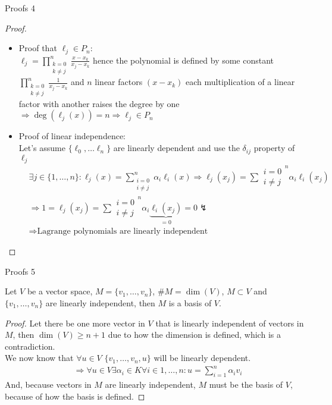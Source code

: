 \documentclass[8pt]{beamer}
\begin{document}
		\begin{frame}{Proofs 4}
			\begin{proof}
				\begin{itemize}
					\item 
					Proof that $\ell_j \in P_n$:\\
					$\displaystyle \ell_j = \prod_{\substack{k= 0 \\ k \neq j }}^{n}\frac{x - x_k}{x_j - x_k}$ hence the polynomial is defined by some constant $\displaystyle \prod_{\substack{k= 0 \\ k \neq j }}^{n}\frac{1}{x_j - x_k}$ and $n$ linear factors $(x-x_k)$ each multiplication of a linear factor with another raises the degree by one $\Rightarrow \deg(\ell_j(x)) = n \Rightarrow \ell_j \in P_n$
					\item Proof of linear independence:\\
					Let's assume $\{\ell_0, \ldots \ell_n \}$ are linearly dependent and use the $\delta_{ij}$ property of $\ell_j$
					\begin{align*}
						&\exists j \in \{1, \ldots ,n \} : \ell_j(x) = \sum_{\substack{i= 0 \\ i \neq j }}^{n} \alpha_i \ell_i(x)
						\Rightarrow  \ell_j(x_j) = \sum{\substack{i= 0 \\ i \neq j }}^{n} \alpha_i \ell_i(x_j)\\
						&\Rightarrow 1 = \ell_j(x_j) = \sum{\substack{i= 0 \\ i \neq j }}^{n} \alpha_i \underbrace{\ell_i(x_j)}_{=0} = 0 \lightning\\& \Rightarrow \text{Lagrange polynomials are linearly independent}
					\end{align*}
				\end{itemize}
			\end{proof}
		\end{frame}
									
		\begin{frame}{Proofs 5}
			\begin{theorem}
				Let $V$ be a vector space, $M = \{v_1, \ldots, v_n\}$, $\# M = \dim(V)$, $M \subset V$ and $\{v_1, \ldots, v_n\}$ are linearly independent, then $M$ is a basis of $V$.
			\end{theorem}
			\begin{proof}
				Let there be one more vector in $V$ that is linearly independent of vectors in $M$, then $\dim(V) \geq n+1$ due to how the dimension is defined, which is a contradiction.\\ 
				We now know that $\forall u \in V$ $\{v_1, \ldots, v_n, u\}$ will be linearly dependent.
				\begin{align*}
					&\Rightarrow \forall u \in V \exists \alpha_i \in K \forall i \in 1, \ldots, n: u = \sum_{i = 1}^{n}\alpha_i v_i 
				\end{align*}
				And, because vectors in $M$ are linearly independent, $M$ must be the basis of $V$, because of how the basis is defined.
			\end{proof}
		\end{frame}
											
\end{document}
